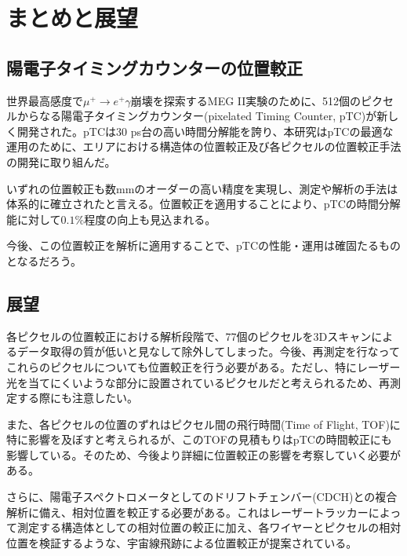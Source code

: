 \documentclass[Yonemoto_master.tex]{subfiles}
\begin{document}
\chapter{まとめと展望}

\section{陽電子タイミングカウンターの位置較正}
世界最高感度で$\mu^+ \to e^+ \gamma$崩壊を探索するMEG II実験のために、512個のピクセルからなる陽電子タイミングカウンター(pixelated Timing Counter, pTC)が新しく開発された。pTCは$30$ ps台の高い時間分解能を誇り、本研究はpTCの最適な運用のために、エリアにおける構造体の位置較正及び各ピクセルの位置較正手法の開発に取り組んだ。

いずれの位置較正も数mmのオーダーの高い精度を実現し、測定や解析の手法は体系的に確立されたと言える。位置較正を適用することにより、pTCの時間分解能に対して$0.1\%$程度の向上も見込まれる。

今後、この位置較正を解析に適用することで、pTCの性能・運用は確固たるものとなるだろう。

\section{展望}
各ピクセルの位置較正における解析段階で、77個のピクセルを3Dスキャンによるデータ取得の質が低いと見なして除外してしまった。今後、再測定を行なってこれらのピクセルについても位置較正を行う必要がある。ただし、特にレーザー光を当てにくいような部分に設置されているピクセルだと考えられるため、再測定する際にも注意したい。

また、各ピクセルの位置のずれはピクセル間の飛行時間(Time of Flight, TOF)に特に影響を及ぼすと考えられるが、このTOFの見積もりはpTCの時間較正にも影響している。そのため、今後より詳細に位置較正の影響を考察していく必要がある。

さらに、陽電子スペクトロメータとしてのドリフトチェンバー(CDCH)との複合解析に備え、相対位置を較正する必要がある。これはレーザートラッカーによって測定する構造体としての相対位置の較正に加え、各ワイヤーとピクセルの相対位置を検証するような、宇宙線飛跡による位置較正が提案されている。
 
\end{document}
